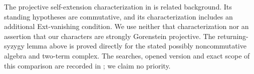 \begin{remark*}
The projective self-extension characterization in
\cite[Proposition~2.9, printed page~8]{CP2-BennisMahdou2006}
is related background.  Its standing hypotheses are commutative,
and its characterization includes an additional Ext-vanishing
condition.  We use neither that characterization nor an assertion
that our characters are strongly Gorenstein projective.
The returning-syzygy lemma above is proved directly for the stated
possibly noncommutative algebra and two-term complex.  The searches,
opened version and exact scope of this comparison are recorded in
; we claim no priority.
\end{remark*}
